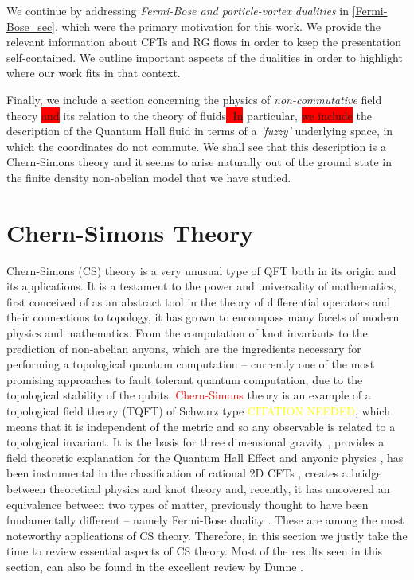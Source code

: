    We continue by addressing \textit{Fermi-Bose and particle-vortex dualities} in \ref{Fermi-Bose_sec}, which were the primary motivation for this work. We provide the relevant information about CFTs and RG flows in order to keep the presentation self-contained. We outline important aspects of the dualities in order to highlight where our work fits in that context.

    Finally, we include a section concerning the physics of \textit{non-commutative} field theory \colorbox{red}{and} its relation to the theory of fluids\colorbox{red}{. In} particular, \colorbox{red}{we include} the description of the Quantum Hall fluid in terms of a \textit{'fuzzy'} underlying space, in which the coordinates do not commute. We shall see that this description is a Chern-Simons theory and it seems to arise naturally out of the ground state in the finite density non-abelian model that we have studied.

        \section{Chern-Simons Theory} \label{CS_sec}
    Chern-Simons (CS) theory is a very unusual type of QFT both in its origin and its applications. It is a testament to the power and universality of mathematics, first conceived of as an abstract tool in the theory of differential operators and their connections to topology, it has grown to encompass many facets of modern physics and mathematics. From the computation of knot invariants to the prediction of non-abelian anyons, which are the ingredients necessary for performing a topological quantum computation -- currently one of the most promising approaches to fault tolerant quantum computation, due to the topological stability of the qubits. \textcolor{red}{Chern-Simons} theory is an example of a topological field theory (TQFT) of Schwarz type \textcolor{yellow}{CITATION NEEDED}, which means that it is independent of the metric and so any observable is related to a topological invariant. It is the basis for three dimensional gravity \cite{Carlip:2005zn}, provides a field theoretic explanation for the Quantum Hall Effect and anyonic physics \cite{Zee, Tong:2016kpv}, has been instrumental in the classification of rational 2D CFTs \cite{Moore1989}, creates a bridge between theoretical physics and knot theory \cite{Witten1989} and, recently, it has uncovered an equivalence between two types of matter, previously thought to have been fundamentally different -- namely Fermi-Bose duality \cite{Aharony:2015mjs}. These are among the most noteworthy applications of CS theory. Therefore, in this section we justly take the time to review essential aspects of CS theory. Most of the results seen in this section, can also be found in the excellent review by Dunne \cite{Dunne:1998qy}.

